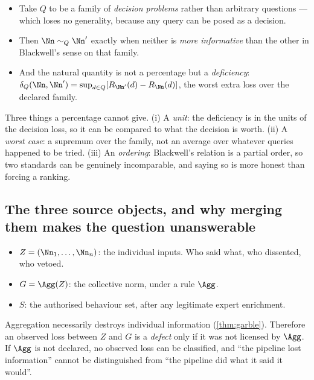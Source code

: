 \begin{itemize}
\item Take $Q$ to be a family of \emph{decision problems} rather than arbitrary
      questions --- which loses no generality, because any query can be posed as
      a decision.
\item Then $\Nn \sim_Q \Nn'$ exactly when neither is \emph{more informative} than
      the other in Blackwell's sense on that family.
\item And the natural quantity is not a percentage but a \emph{deficiency}:
      $\delta_Q(\Nn,\Nn') = \sup_{d\in Q}[R_{\Nn'}(d)-R_{\Nn}(d)]$, the worst
      extra loss over the declared family.
\end{itemize}

\begin{remark}
Three things a percentage cannot give. (i) A \emph{unit}: the deficiency is in
the units of the decision loss, so it can be compared to what the decision is
worth. (ii) A \emph{worst case}: a supremum over the family, not an average over
whatever queries happened to be tried. (iii) An \emph{ordering}: Blackwell's
relation is a partial order, so two standards can be genuinely incomparable, and
saying so is more honest than forcing a ranking.
\end{remark}

\subsection{The three source objects, and why merging them makes the question unanswerable}

\begin{definition}[Layers]
\label{def:layers}
\begin{itemize}
\item $Z = (\Nn_1,\dots,\Nn_n)$: the individual inputs. Who said what, who
      dissented, who vetoed.
\item $G = \Agg(Z)$: the collective norm, under a rule $\Agg$.
\item $S$: the authorised behaviour set, after any legitimate expert enrichment.
\end{itemize}
\end{definition}

\begin{proposition}
Aggregation necessarily destroys individual information (\cref{thm:garble}).
Therefore an observed loss between $Z$ and $G$ is a \emph{defect} only if it was
not licensed by $\Agg$. If $\Agg$ is not declared, no observed loss can be
classified, and ``the pipeline lost information'' cannot be distinguished from
``the pipeline did what it said it would''.
\end{proposition}

